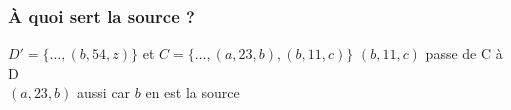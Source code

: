 \documentclass{beamer}
\begin{document}
\begin{frame}

  \frametitle{\`A quoi sert la source ?}

  \begin{block}{$D'=\{\dots,(b,54,z)\}$ et
      $C=\{\dots,(a,23,b),(b,11,c)\}$}
    $(b,11,c)$ passe de C à D\\
    $(a,23,b)$ aussi car $b$ en est la source
  \end{block}

\end{frame}

\begin{frame}
  \begin{figure}
    \centering
    
  \end{figure}
\end{frame}

\begin{frame}
  \begin{figure}
    \centering
    
  \end{figure}
\end{frame}

\begin{frame}
  \begin{figure}
    \centering
    
  \end{figure}
\end{frame}

\begin{frame}
  \begin{figure}
    \centering
    
  \end{figure}
\end{frame}

\begin{frame}
  \begin{figure}
    \centering
    
  \end{figure}
\end{frame}

\begin{frame}
  \begin{figure}
    \centering
    
  \end{figure}
\end{frame}

\begin{frame}
  \begin{figure}
    \centering
    
  \end{figure}
\end{frame}
\end{document}
